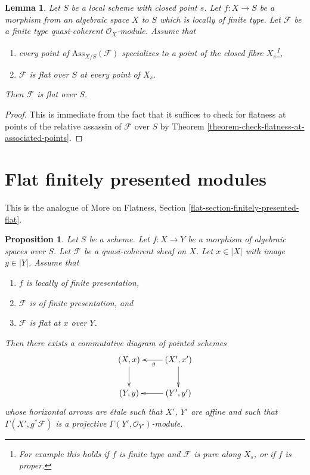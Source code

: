 \documentclass{stacks-project}
\theoremstyle{plain}
\newtheorem{proposition}[subsection]{Proposition}
\newtheorem{lemma}[subsection]{Lemma}
\theoremstyle{definition}
\theoremstyle{remark}
\numberwithin{equation}{subsection}
\begin{document}
\begin{lemma}
\label{lemma-check-along-closed-fibre}
Let $S$ be a local scheme with closed point $s$.
Let $f : X \to S$ be a morphism from an algebraic space $X$ to $S$
which is locally of finite type.
Let $\mathcal{F}$ be a finite type quasi-coherent $\mathcal{O}_X$-module.
Assume that
\begin{enumerate}
\item every point of $\text{Ass}_{X/S}(\mathcal{F})$ specializes
to a point of the closed fibre $X_s$\footnote{For example this holds if
$f$ is finite type and $\mathcal{F}$ is pure along $X_s$, or
if $f$ is proper.},
\item $\mathcal{F}$ is flat over $S$ at every point of $X_s$.
\end{enumerate}
Then $\mathcal{F}$ is flat over $S$.
\end{lemma}

\begin{proof}
This is immediate from the fact that it suffices to check for
flatness at points of the relative assassin of $\mathcal{F}$
over $S$ by
Theorem \ref{theorem-check-flatness-at-associated-points}.
\end{proof}




\section{Flat finitely presented modules}
\label{section-finitely-presented-flat}

\noindent
This is the analogue of More on Flatness, Section
\ref{flat-section-finitely-presented-flat}.

\begin{proposition}
\label{proposition-finite-presentation-flat-at-point}
Let $S$ be a scheme.
Let $f : X \to Y$ be a morphism of algebraic spaces over $S$.
Let $\mathcal{F}$ be a quasi-coherent sheaf on $X$.
Let $x \in |X|$ with image $y \in |Y|$.
Assume that
\begin{enumerate}
\item $f$ is locally of finite presentation,
\item $\mathcal{F}$ is of finite presentation, and
\item $\mathcal{F}$ is flat at $x$ over $Y$.
\end{enumerate}
Then there exists a commutative diagram of pointed schemes
$$
\xymatrix{
(X, x) \ar[d] & (X', x') \ar[l]^g \ar[d] \\
(Y, y) & (Y', y') \ar[l]
}
$$
whose horizontal arrows are \'etale such that $X'$, $Y'$
are affine and such that
$\Gamma(X', g^*\mathcal{F})$ is a projective
$\Gamma(Y', \mathcal{O}_{Y'})$-module.
\end{proposition}
\end{document}
